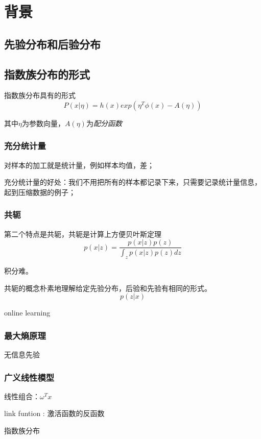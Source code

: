 \chapter{背景}

\section{先验分布和后验分布}

\section{指数族分布的形式}

指数族分布具有的形式
\begin{equation}
    P(x|\eta)=h(x)exp(\eta^T\phi(x)-A(\eta))
\end{equation}

其中$\eta$为参数向量，$A(\eta)$为\textsl{配分函数}

\subsection*{充分统计量}

对样本的加工就是统计量，例如样本均值，差；

充分统计量的好处：我们不用把所有的样本都记录下来，只需要记录统计量信息，起到压缩数据的例子；

\subsection*{共轭}
第二个特点是共轭，共轭是计算上方便贝叶斯定理
\begin{equation}
    p(x|z)=\frac{p(x|z)p(z)}{\int_{z}p(x|z)p(z)dz}
\end{equation}

积分难。

共轭的概念朴素地理解给定先验分布，后验和先验有相同的形式。
\begin{equation}
    p(z|x)
\end{equation}

online learning

\subsection*{最大熵原理}

无信息先验

\subsection*{广义线性模型}

线性组合：$\omega^Tx$

link funtion : 激活函数的反函数

指数族分布

